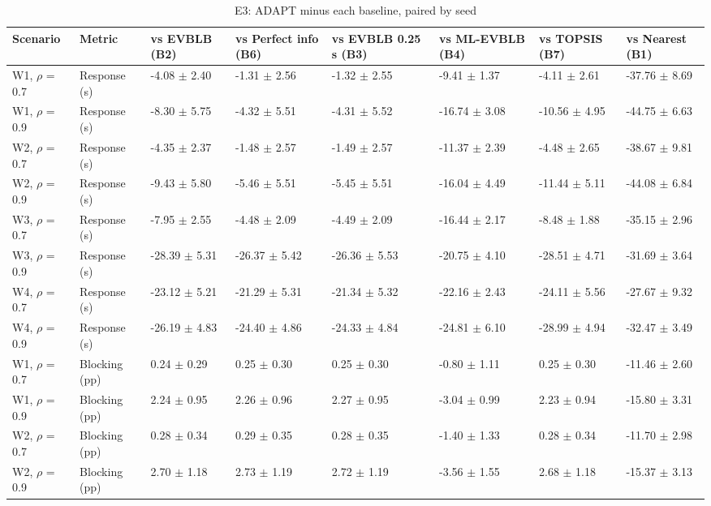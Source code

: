 \begin{table}[t]
\centering
\footnotesize
\caption{E3: ADAPT minus each baseline, paired by seed}
\label{tab:e3_paired}
\begin{tabular}{llllllll}
\toprule
Scenario & Metric & vs EVBLB (B2) & vs Perfect info (B6) & vs EVBLB 0.25 s (B3) & vs ML-EVBLB (B4) & vs TOPSIS (B7) & vs Nearest (B1) \\
\midrule
W1, $\rho$ = 0.7 & Response (s) & -4.08 $\pm$ 2.40 & -1.31 $\pm$ 2.56 & -1.32 $\pm$ 2.55 & -9.41 $\pm$ 1.37 & -4.11 $\pm$ 2.61 & -37.76 $\pm$ 8.69 \\
W1, $\rho$ = 0.9 & Response (s) & -8.30 $\pm$ 5.75 & -4.32 $\pm$ 5.51 & -4.31 $\pm$ 5.52 & -16.74 $\pm$ 3.08 & -10.56 $\pm$ 4.95 & -44.75 $\pm$ 6.63 \\
W2, $\rho$ = 0.7 & Response (s) & -4.35 $\pm$ 2.37 & -1.48 $\pm$ 2.57 & -1.49 $\pm$ 2.57 & -11.37 $\pm$ 2.39 & -4.48 $\pm$ 2.65 & -38.67 $\pm$ 9.81 \\
W2, $\rho$ = 0.9 & Response (s) & -9.43 $\pm$ 5.80 & -5.46 $\pm$ 5.51 & -5.45 $\pm$ 5.51 & -16.04 $\pm$ 4.49 & -11.44 $\pm$ 5.11 & -44.08 $\pm$ 6.84 \\
W3, $\rho$ = 0.7 & Response (s) & -7.95 $\pm$ 2.55 & -4.48 $\pm$ 2.09 & -4.49 $\pm$ 2.09 & -16.44 $\pm$ 2.17 & -8.48 $\pm$ 1.88 & -35.15 $\pm$ 2.96 \\
W3, $\rho$ = 0.9 & Response (s) & -28.39 $\pm$ 5.31 & -26.37 $\pm$ 5.42 & -26.36 $\pm$ 5.53 & -20.75 $\pm$ 4.10 & -28.51 $\pm$ 4.71 & -31.69 $\pm$ 3.64 \\
W4, $\rho$ = 0.7 & Response (s) & -23.12 $\pm$ 5.21 & -21.29 $\pm$ 5.31 & -21.34 $\pm$ 5.32 & -22.16 $\pm$ 2.43 & -24.11 $\pm$ 5.56 & -27.67 $\pm$ 9.32 \\
W4, $\rho$ = 0.9 & Response (s) & -26.19 $\pm$ 4.83 & -24.40 $\pm$ 4.86 & -24.33 $\pm$ 4.84 & -24.81 $\pm$ 6.10 & -28.99 $\pm$ 4.94 & -32.47 $\pm$ 3.49 \\
W1, $\rho$ = 0.7 & Blocking (pp) & 0.24 $\pm$ 0.29 & 0.25 $\pm$ 0.30 & 0.25 $\pm$ 0.30 & -0.80 $\pm$ 1.11 & 0.25 $\pm$ 0.30 & -11.46 $\pm$ 2.60 \\
W1, $\rho$ = 0.9 & Blocking (pp) & 2.24 $\pm$ 0.95 & 2.26 $\pm$ 0.96 & 2.27 $\pm$ 0.95 & -3.04 $\pm$ 0.99 & 2.23 $\pm$ 0.94 & -15.80 $\pm$ 3.31 \\
W2, $\rho$ = 0.7 & Blocking (pp) & 0.28 $\pm$ 0.34 & 0.29 $\pm$ 0.35 & 0.28 $\pm$ 0.35 & -1.40 $\pm$ 1.33 & 0.28 $\pm$ 0.34 & -11.70 $\pm$ 2.98 \\
W2, $\rho$ = 0.9 & Blocking (pp) & 2.70 $\pm$ 1.18 & 2.73 $\pm$ 1.19 & 2.72 $\pm$ 1.19 & -3.56 $\pm$ 1.55 & 2.68 $\pm$ 1.18 & -15.37 $\pm$ 3.13 \\

\end{tabular}
\end{table}
